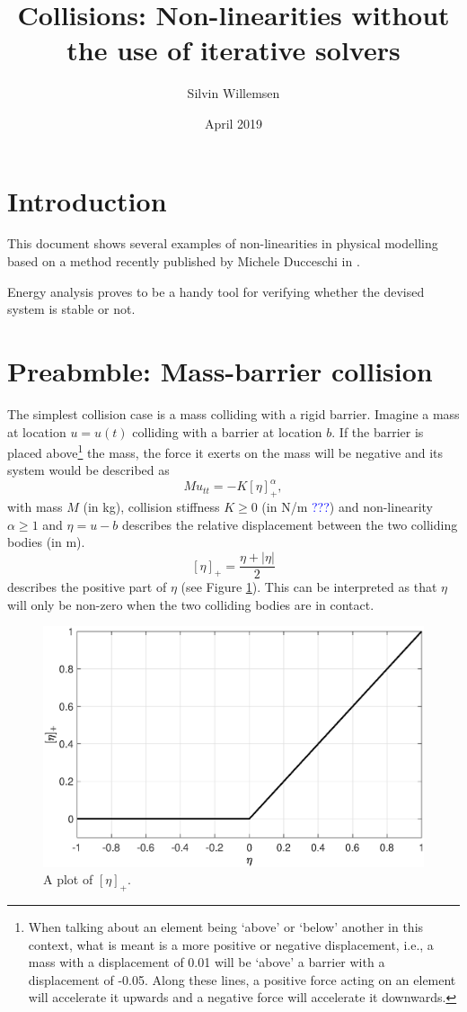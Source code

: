 \documentclass{article}
\title{Collisions: Non-linearities without the use of iterative solvers}
\author{Silvin Willemsen}
\date{April 2019}
\def\SWcomment[#1]{\textcolor{blue}{#1}}
\begin{document}
\ifpdf %
\else  %
\fi

\maketitle

\section{Introduction}
This document shows several examples of non-linearities in physical modelling based on a method recently published by Michele Ducceschi in \cite{Ducceschi2019}.

Energy analysis proves to be a handy tool for verifying whether the devised system is stable or not.

\section{Preabmble: Mass-barrier collision}
The simplest collision case is a mass colliding with a rigid barrier. Imagine a mass at location $u = u(t)$ colliding with a barrier at location $b$. If the barrier is placed above\footnote{When talking about an element being `above' or `below' another in this context, what is meant is a more positive or negative displacement, i.e., a mass with a displacement of 0.01 will be `above' a barrier with a displacement of -0.05. Along these lines, a positive force acting on an element will accelerate it upwards and a negative force will accelerate it downwards.} the mass, the force it exerts on the mass will be negative and its system would be described as
\begin{equation}\label{eq:massBarrier}
    Mu_{tt} = -K[\eta]_+^\alpha,
\end{equation}
with mass $M$ (in kg), collision stiffness $K \geq 0$ (in N/m \SWcomment[???]) and non-linearity $\alpha \geq 1$ and $\eta = u - b$ describes the relative displacement between the two colliding bodies (in m).
\begin{equation}\label{eq:etaPlus}
    [\eta]_+ = \frac{\eta + |\eta|}{2}
\end{equation}
describes the positive part of $\eta$ (see Figure \ref{fig:eta}). This can be interpreted as that $\eta$ will only be non-zero when the two colliding bodies are in contact.

\begin{figure}[h]
\centerline{\includegraphics[width=0.6\columnwidth]{eta.eps}}
\caption{\label{fig:eta}{A plot of $[\eta]_+$.}}
\end{figure}
\end{document}
